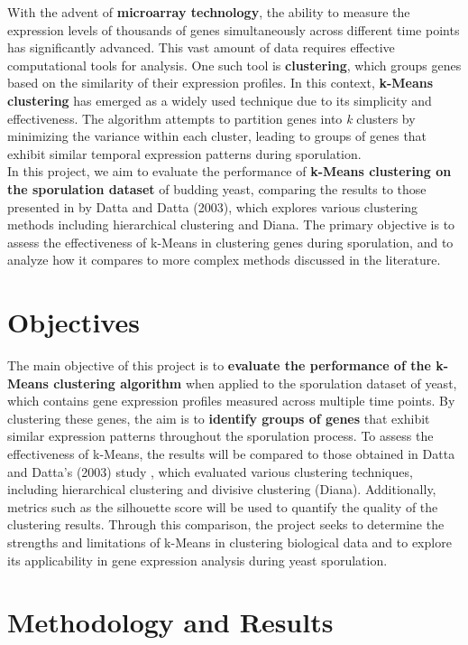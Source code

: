 \documentclass{article}
\begin{document}
With the advent of \textbf{microarray technology}, the ability to measure the expression levels of thousands of genes simultaneously across different time points has significantly advanced. This vast amount of data requires effective computational tools for analysis. One such tool is \textbf{clustering}, which groups genes based on the similarity of their expression profiles. In this context, \textbf{k-Means clustering} has emerged as a widely used technique due to its simplicity and effectiveness. The algorithm attempts to partition genes into
\emph{k} clusters by minimizing the variance within each cluster, leading to groups of genes that exhibit similar temporal expression patterns during sporulation.
\\

In this project, we aim to evaluate the performance of \textbf{k-Means clustering on the sporulation dataset} of budding yeast, comparing the results to those presented in  by Datta and Datta (2003)\cite{datta2003comparison}, which explores various clustering methods including hierarchical clustering and Diana. The primary objective is to assess the effectiveness of k-Means in clustering genes during sporulation, and to analyze how it compares to more complex methods discussed in the literature.

\section{Objectives}
The main objective of this project is to \textbf{evaluate the performance of the k-Means clustering algorithm} when applied to the sporulation dataset of yeast, which contains gene expression profiles measured across multiple time points. By clustering these genes, the aim is to \textbf{identify groups of genes} that exhibit similar expression patterns throughout the sporulation process. To assess the effectiveness of k-Means, the results will be compared to those obtained in Datta and Datta's (2003) study \cite{datta2003comparison}, which evaluated various clustering techniques, including hierarchical clustering and divisive clustering (Diana). Additionally, metrics such as the silhouette score will be used to quantify the quality of the clustering results. Through this comparison, the project seeks to determine the strengths and limitations of k-Means in clustering biological data and to explore its applicability in gene expression analysis during yeast sporulation.
	
	
\section{Methodology and Results}
\end{document}
